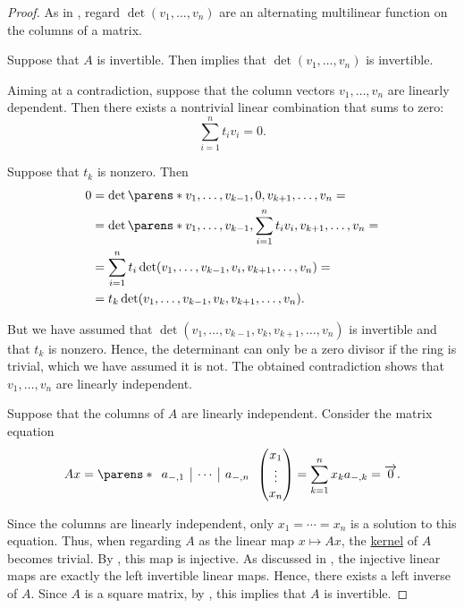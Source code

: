 \begin{proof}
  \SufficiencySubProof As in , regard \( \det(v_1, \ldots, v_n) \) are an alternating multilinear function on the columns of a matrix.

  Suppose that \( A \) is invertible. Then  implies that \( \det(v_1, \ldots, v_n) \) is invertible.

  Aiming at a contradiction, suppose that the column vectors \( v_1, \ldots, v_n \) are linearly dependent. Then there exists a nontrivial linear combination that sums to zero:
  \begin{equation*}
    \sum_{i=1}^n t_i v_i = 0.
  \end{equation*}

  Suppose that \( t_k \) is nonzero. Then
  \begin{align*}
    0
    &=
    \det\parens*{ v_1, \ldots, v_{k-1}, 0, v_{k+1}, \ldots, v_n }
    = \\ &=
    \det\parens*{ v_1, \ldots, v_{k-1}, \sum_{i=1}^n t_i v_i, v_{k+1}, \ldots, v_n }
    = \\ &=
    \sum_{i=1}^n t_i \det( v_1, \ldots, v_{k-1}, v_i, v_{k+1}, \ldots, v_n )
    = \\ &=
    t_k \det( v_1, \ldots, v_{k-1}, v_k, v_{k+1}, \ldots, v_n ).
  \end{align*}

  But we have assumed that \( \det( v_1, \ldots, v_{k-1}, v_k, v_{k+1}, \ldots, v_n ) \) is invertible and that \( t_k \) is nonzero. Hence, the determinant can only be a zero divisor if the ring is trivial, which we have assumed it is not. The obtained contradiction shows that \( v_1, \ldots, v_n \) are linearly independent.

  \NecessitySubProof Suppose that the columns of \( A \) are linearly independent. Consider the matrix equation
  \begin{equation*}
    Ax
    =
    \parens*
    {
      \begin{array}{c|c|c}
        a_{\anon*,1} & \cdots & a_{\anon*,n}
      \end{array}
    }
    \begin{pmatrix}
      x_1 \\ \vdots \\ x_n
    \end{pmatrix}
    =
    \sum_{k=1}^n x_k a_{\anon*,k}
    =
    \vect 0.
  \end{equation*}

  Since the columns are linearly independent, only \( x_1 = \cdots = x_n \) is a solution to this equation. Thus, when regarding \( A \) as the linear map \( x \mapsto Ax \), the \hyperref[def:module/kernel]{kernel} of \( A \) becomes trivial. By , this map is injective. As discussed in , the injective linear maps are exactly the left invertible linear maps. Hence, there exists a left inverse of \( A \). Since \( A \) is a square matrix, by , this implies that \( A \) is invertible.
\end{proof}

